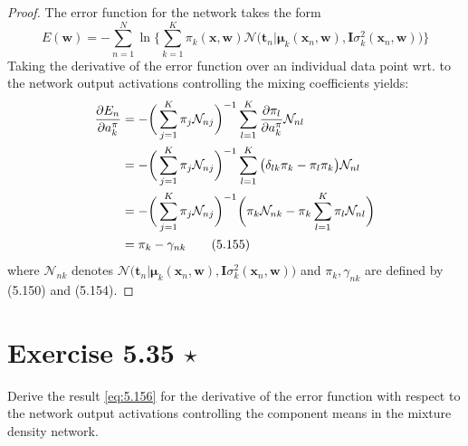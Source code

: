 \vspace{1em}

\begin{proof}
    The error function for the network takes the form
    \begin{equation}\label{eq:5.153}\tag{5.153}
        E(\mathbf{w}) 
        = -\sum_{n=1}^{N} \ln
        \bigg\{\sum_{k=1}^{K} \pi_k(\mathbf{x}, \mathbf{w}) 
            \mathcal{N}\big(\mathbf{t}_n | \bm{\mu}_k(\mathbf{x}_n, \mathbf{w}),
        \mathbf{I}\sigma_k^2(\mathbf{x}_n, \mathbf{w})\big)\bigg\}
    \end{equation}
    Taking the derivative of the error function over an individual data point 
    wrt. to the network output activations controlling the mixing coefficients
    yields:
    \begin{align*}
        \pdv{E_n}{a_k^\pi}
        &= -\bigg(\sum_{j=1}^{K} \pi_j \mathcal{N}_{nj}\bigg)^{-1}
        \sum_{l=1}^{K} \pdv{\pi_l}{a_k^\pi} \mathcal{N}_{nl} \\
        &= -\bigg(\sum_{j=1}^{K} \pi_j \mathcal{N}_{nj}\bigg)^{-1}
        \sum_{l=1}^{K} \big(\delta_{lk} \pi_k - \pi_l \pi_k\big) \mathcal{N}_{nl} \\
        &= -\bigg(\sum_{j=1}^{K} \pi_j \mathcal{N}_{nj}\bigg)^{-1}
        \bigg(\pi_k \mathcal{N}_{nk} - \pi_k \sum_{l=1}^{K} \pi_l \mathcal{N}_{nl}\bigg) \\
        &= \pi_k - \gamma_{nk} \label{eq:5.155}\tag{5.155}
    \end{align*}
    where $\mathcal{N}_{nk}$ denotes 
    $\mathcal{N}\big(\mathbf{t}_n | \bm{\mu}_k(\mathbf{x}_n, \mathbf{w}), 
        \mathbf{I}\sigma_k^2(\mathbf{x}_n, \mathbf{w})\big)$ and $\pi_k, \gamma_{nk}$ 
        are defined by (5.150) and (5.154).
\end{proof}

\section*{Exercise 5.35 $\star$}
Derive the result \eqref{eq:5.156} for the derivative
of the error function with respect to the network output
activations controlling the component means in the mixture
density network.

\vspace{1em}

